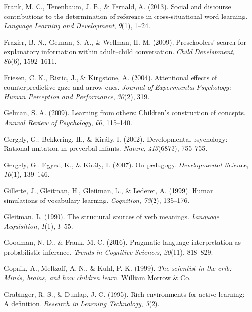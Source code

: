 \documentclass[oneside]{report}
\begin{document}
\leavevmode\hypertarget{ref-frank2013social}{}%
Frank, M. C., Tenenbaum, J. B., \& Fernald, A. (2013). Social and
discourse contributions to the determination of reference in
cross-situational word learning. \emph{Language Learning and
Development}, \emph{9}(1), 1--24.

\leavevmode\hypertarget{ref-frazier2009preschoolers}{}%
Frazier, B. N., Gelman, S. A., \& Wellman, H. M. (2009). Preschoolers'
search for explanatory information within adult--child conversation.
\emph{Child Development}, \emph{80}(6), 1592--1611.

\leavevmode\hypertarget{ref-friesen2004attentional}{}%
Friesen, C. K., Ristic, J., \& Kingstone, A. (2004). Attentional effects
of counterpredictive gaze and arrow cues. \emph{Journal of Experimental
Psychology: Human Perception and Performance}, \emph{30}(2), 319.

\leavevmode\hypertarget{ref-gelman2009learning}{}%
Gelman, S. A. (2009). Learning from others: Children's construction of
concepts. \emph{Annual Review of Psychology}, \emph{60}, 115--140.

\leavevmode\hypertarget{ref-gergely2002developmental}{}%
Gergely, G., Bekkering, H., \& Király, I. (2002). Developmental
psychology: Rational imitation in preverbal infants. \emph{Nature},
\emph{415}(6873), 755--755.

\leavevmode\hypertarget{ref-gergely2007pedagogy}{}%
Gergely, G., Egyed, K., \& Király, I. (2007). On pedagogy.
\emph{Developmental Science}, \emph{10}(1), 139--146.

\leavevmode\hypertarget{ref-gillette1999human}{}%
Gillette, J., Gleitman, H., Gleitman, L., \& Lederer, A. (1999). Human
simulations of vocabulary learning. \emph{Cognition}, \emph{73}(2),
135--176.

\leavevmode\hypertarget{ref-gleitman1990structural}{}%
Gleitman, L. (1990). The structural sources of verb meanings.
\emph{Language Acquisition}, \emph{1}(1), 3--55.

\leavevmode\hypertarget{ref-goodman2016pragmatic}{}%
Goodman, N. D., \& Frank, M. C. (2016). Pragmatic language
interpretation as probabilistic inference. \emph{Trends in Cognitive
Sciences}, \emph{20}(11), 818--829.

\leavevmode\hypertarget{ref-gopnik1999scientist}{}%
Gopnik, A., Meltzoff, A. N., \& Kuhl, P. K. (1999). \emph{The scientist
in the crib: Minds, brains, and how children learn.} William Morrow \&
Co.

\leavevmode\hypertarget{ref-grabinger1995rich}{}%
Grabinger, R. S., \& Dunlap, J. C. (1995). Rich environments for active
learning: A definition. \emph{Research in Learning Technology},
\emph{3}(2).
\end{document}
